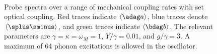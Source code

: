 \begin{figure}[htb]
\centering
{}
\qquad
{}
\\
\qquad
{}
\caption[Probe spectra over a range of mechanical coupling rates]{\small{Probe spectra over a range of mechanical coupling rates with set optical coupling. Red traces indicate $\langle \adag a \rangle$, blue traces denote $\langle \splus\sminus \rangle$, and green traces indicate $\langle \bdag b \rangle$. The relevant parameters are $\gamma = \kappa = \omega_M = 1$, $Y/\gamma = 0.01$, and $g/\gamma = 3$. A maximum of 64 phonon excitations is allowed in the oscillator.}}
\label{fig5gM}
\end{figure}

